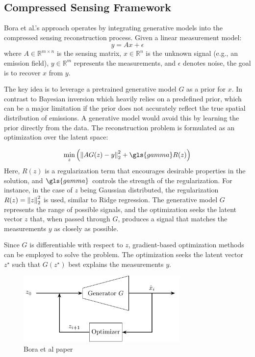 \subsection{Compressed Sensing Framework}

Bora et al.'s approach operates by integrating generative models into the compressed sensing reconstruction process.
Given a linear measurement model:
\begin{equation}
    y = A x + \epsilon
\end{equation}
where $A \in \mathbb{R}^{m \times n}$ is the sensing matrix, $x \in \mathbb{R}^n$ is the unknown signal (e.g., an emission field), $y \in \mathbb{R}^m$ represents the measurements, and $\epsilon$ denotes noise, the goal is to recover $x$ from $y$.

The key idea is to leverage a pretrained generative model $G$ as a prior for $x$.
In contrast to Bayesian inversion which heavily relies on a predefined prior, which can be a major limitation if the prior does not accurately reflect the true spatial distribution of emissions.
A generative model would avoid this by learning the prior directly from the data.
The reconstruction problem is formulated as an optimization over the latent space:

\begin{equation}
    \min_{z}{\left( \norm{A G(z) - y}_2^2 + \gls{gamma} R(z) \right)}
\end{equation}
Here, $R(z)$ is a regularization term that encourages desirable properties in the solution, and $\gls{gamma}$ controls the strength of the regularization.
For instance, in the case of $z$ being Gaussian distributed, the regularization $R(z) = \left\lVert z\right\rVert_2^2$ is used, similar to Ridge regression.
The generative model $G$ represents the range of possible signals, and the optimization seeks the latent vector $z$ that, when passed through $G$, produces a signal that matches the measurements $y$ as closely as possible.

Since $G$ is differentiable with respect to $z$, gradient-based optimization methods can be employed to solve the problem.
The optimization seeks the latent vector $z^{\star}$ such that $G(z^{\star})$ best explains the measurements $y$.

\begin{figure}[h!]
    \centering
    \includegraphics[width=0.75\textwidth]{figures/02_related_work/latent_variable_optimization/build/latent_variable_optimization.pdf}
    \caption{Bora et al paper}
    \label{fig:gen_solver}
\end{figure}

